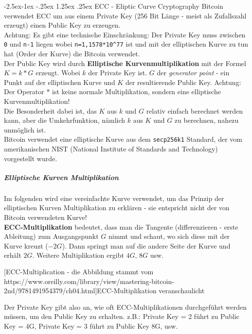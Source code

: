 \documentclass[10pt,a4paper,titlepage]{paper}
\makeatletter
\renewcommand\paragraph{\@startsection{paragraph}{4}{\z@}%
            {-2.5ex\@plus -1ex \@minus -.25ex}%
            {1.25ex \@plus .25ex}%
            {\normalfont\normalsize\bfseries}}
\makeatother
\begin{document}
\paragraph{ECC - Eliptic Curve Cryptography} \label{ECC}
Bitcoin verwendet ECC um aus einem Private Key (256 Bit Länge - meist als Zufallszahl erzeugt) einen Public Key zu erzeugen.\\
Achtung: Es gibt eine technische Einschränkung: Der Private Key muss zwischen \verb|0| und \verb|n-1| liegen wobei \verb|n=1,1578*10^77| ist und mit der elliptischen Kurve zu tun hat (Order der Kurve) die Bitcoin verwendet.\\
Der Public Key wird durch \textbf{Elliptische Kurvenmultiplikation} mit der Formel $K=k*G$ erzeugt. Wobei $k$ der Private Key ist. $G$ der \textit{generator point} - ein Punkt auf der elliptischen Kurve und $K$ der resultierende Public Key. Achtung: Der Operator $*$ ist keine normale Multiplikation, sondern eine elliptische Kurvenmultiplikation!\\
Die Besonderheit dabei ist, das $K$ aus $k$ und $G$ relativ einfach berechnet werden kann, aber die Umkehrfunktion, nämlich $k$ aus $K$ und $G$ zu berechnen, nahezu unmöglich ist.\\
Bitcoin verwendet eine elliptische Kurve aus dem \verb|secp256k1| Standard, der vom amerikanischen NIST (National Institute of Standards and Technology) vorgestellt wurde.\\
\subparagraph{Elliptische Kurven Multiplikation}
Im folgenden wird eine vereinfachte Kurve verwendet, um das Prinzip der elliptischen Kurven Multiplikation zu erklären - sie entspricht nicht der von Bitcoin verwendeten Kurve!\\
\textbf{ECC-Multiplikation} bedeutet, dass man die Tangente (differenzieren - erste Ableitung) zum Ausgangspunkt $G$ nimmt und schaut, wo sich diese mit der Kurve kreuzt ($-2G$). Dann springt man auf die andere Seite der Kurve und erhält $2G$. Weitere Multiplikation ergibt $4G$, $8G$ usw.
\begin{center}
[ECC-Multiplication - die Abbildung stammt vom https://www.oreilly.com/library/view/mastering-bitcoin-2nd/9781491954379/ch04.html]{ECC-Multiplikation veranschaulicht}
\end{center}
Der Private Key gibt also an, wie oft ECC-Multiplikationen durchgeführt werden müssen, um den Public Key zu erhalten.
z.B.: Private Key = 2 führt zu Public Key = 4G, Private Key = 3 führt zu Public Key 8G, usw.
\end{document}
